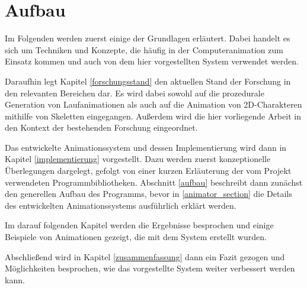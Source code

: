 \section{Aufbau}
Im Folgenden werden zuerst einige der Grundlagen erläutert. Dabei handelt es sich um Techniken und Konzepte, die häufig in der Computeranimation zum Einsatz kommen und auch von dem hier vorgestellten System verwendet werden.

Daraufhin legt Kapitel \ref{forschungsstand} den aktuellen Stand der Forschung in den relevanten Bereichen dar. Es wird dabei sowohl auf die prozedurale Generation von Laufanimationen als auch auf die Animation von 2D-Charakteren mithilfe von Skeletten eingegangen. Außerdem wird die hier vorliegende Arbeit in den Kontext der bestehenden Forschung eingeordnet.

Das entwickelte Animationssystem und dessen Implementierung wird dann in Kapitel \ref{implementierung} vorgestellt. Dazu werden zuerst konzeptionelle Überlegungen dargelegt, gefolgt von einer kurzen Erläuterung der vom Projekt verwendeten Programmbibliotheken. Abschnitt \ref{aufbau} beschreibt dann zunächst den generellen Aufbau des Programms, bevor in \ref{animator_section} die Details des entwickelten Animationssystems ausführlich erklärt werden.

Im darauf folgenden Kapitel werden die Ergebnisse besprochen und einige Beispiele von Animationen gezeigt, die mit dem System erstellt wurden.

Abschließend wird in Kapitel \ref{zusammenfassung} dann ein Fazit gezogen und Möglichkeiten besprochen, wie das vorgestellte System weiter verbessert werden kann.